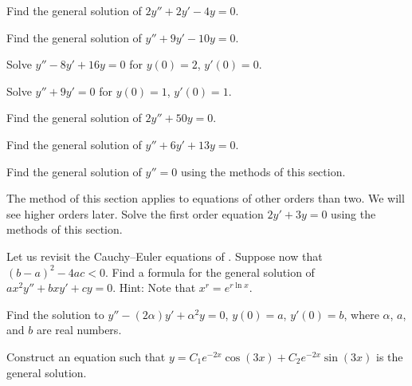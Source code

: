 \begin{exercise}
Find the general solution of $2y'' + 2y' -4 y = 0$.
\end{exercise}

\begin{exercise}
Find the general solution of $y'' + 9y' - 10 y = 0$.
\end{exercise}

\begin{exercise}
Solve $y'' - 8y' + 16 y = 0$ for $y(0) = 2$, $y'(0) = 0$.
\end{exercise}

\begin{exercise}
Solve $y'' + 9y' = 0$ for $y(0) = 1$, $y'(0) = 1$.
\end{exercise}

\begin{exercise}
Find the general solution of $2y'' + 50y = 0$.
\end{exercise}

\begin{exercise}
Find the general solution of $y'' + 6 y' + 13 y = 0$.
\end{exercise}

\begin{exercise}
Find the general solution of $y'' = 0$ using the methods of this section.
\end{exercise}

\begin{exercise}
The method of this section applies to equations of other orders than two.
We will see higher orders later.
Solve the first order equation
$2y' + 3y = 0$ using the methods of this section.
\end{exercise}

\begin{exercise}
Let us revisit the Cauchy--Euler equations of
.  Suppose now
that ${(b-a)}^2-4ac < 0$.  Find a formula for the general solution
of $a x^2 y'' + b x y' + c y = 0$.  Hint: Note that $x^r = e^{r \ln x}$.
\end{exercise}

\begin{exercise}
Find the solution to
$y''-(2\alpha) y' + \alpha^2 y=0$, $y(0) = a$, $y'(0)=b$,
where $\alpha$, $a$, and $b$ are real numbers.
\end{exercise}

\begin{exercise}
Construct an equation such that $y = C_1 e^{-2x} \cos(3x) + C_2 e^{-2x}
\sin(3x)$ is the general
solution.
\end{exercise}

